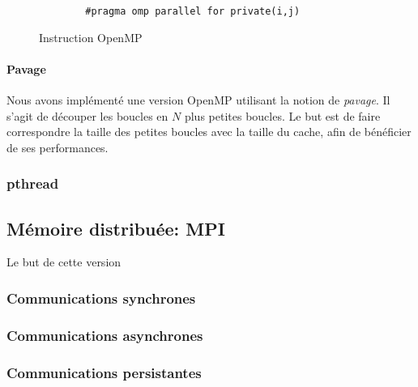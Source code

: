 \begin{figure}[h!]
	\begin{lstlisting}
		#pragma omp parallel for private(i,j)
	\end{lstlisting}
	\caption{Instruction OpenMP}
	\label{omp_parallel}
\end{figure}

\paragraph{Pavage}
Nous avons implémenté une version OpenMP utilisant la notion de \emph{pavage}. Il s'agit de découper les boucles en $N$ plus petites boucles. Le but est de faire correspondre la taille des petites boucles avec la taille du cache, afin de bénéficier de ses performances. 

\subsubsection{pthread}
\label{pthread}


\subsection{Mémoire distribuée: MPI} %
\label{mpi}

Le but de cette version
\subsubsection{Communications synchrones}
\subsubsection{Communications asynchrones}
\subsubsection{Communications persistantes}
